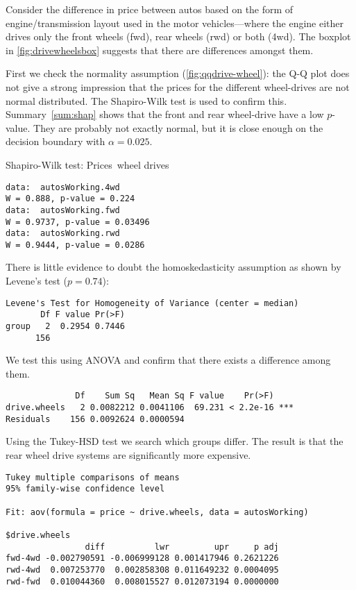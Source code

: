 Consider the difference in price between autos based on the form of engine/transmission layout used in the motor vehicles---where the engine either drives only the front wheels (fwd), rear wheels (rwd) or both (4wd). The boxplot in \autoref{fig:drivewheelsbox} suggests that there are differences amongst them.

First we check the normality assumption (\autoref{fig:qqdrive-wheel}):
the Q-Q plot does not give a strong impression that the prices for the different wheel-drives are not normal distributed. The Shapiro-Wilk test is used to confirm this. Summary~\ref{sum:shap} shows that the front and rear wheel-drive have a low $p$-value. They are probably not exactly normal, but it is close enough on the decision boundary with $\alpha = 0.025$.

\begin{summary}
\caption{Shapiro-Wilk test: Prices~wheel drives}
\label{sum:shap}
\begin{verbatim}
data:  autosWorking.4wd
W = 0.888, p-value = 0.224
data:  autosWorking.fwd
W = 0.9737, p-value = 0.03496
data:  autosWorking.rwd
W = 0.9444, p-value = 0.0286
\end{verbatim}
\end{summary}

There is little evidence to doubt the homoskedasticity assumption as shown by Levene's test ($p=0.74$):
\begin{verbatim}
Levene's Test for Homogeneity of Variance (center = median)
       Df F value Pr(>F)
group   2  0.2954 0.7446
      156  
\end{verbatim}

We test this using ANOVA and confirm that there exists a difference among them.

\begin{verbatim}
              Df    Sum Sq   Mean Sq F value    Pr(>F)
drive.wheels   2 0.0082212 0.0041106  69.231 < 2.2e-16 ***
Residuals    156 0.0092624 0.0000594
\end{verbatim}
      

Using the Tukey-HSD test we search which groups differ. The result is that the rear wheel drive systems are significantly more expensive.
\begin{verbatim}
Tukey multiple comparisons of means
95% family-wise confidence level

Fit: aov(formula = price ~ drive.wheels, data = autosWorking)

$drive.wheels
                diff          lwr         upr     p adj
fwd-4wd -0.002790591 -0.006999128 0.001417946 0.2621226
rwd-4wd  0.007253770  0.002858308 0.011649232 0.0004095
rwd-fwd  0.010044360  0.008015527 0.012073194 0.0000000
\end{verbatim}




